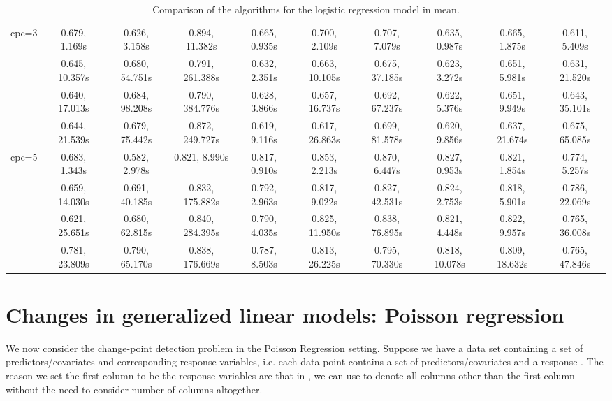 \documentclass[article]{jss}
\begin{document}
\begin{landscape}
\begin{table}[t!]
\begin{tabular}{@{}cccccccccc@{}}
    \multirow{4}{*}{cpc=3} & 0.679, 1.169s & 0.626, 3.158s & 0.894, 11.382s & 0.665, 0.935s & 0.700, 2.109s & 0.707, 7.079s & 0.635, 0.987s & 0.665, 1.875s & 0.611, 5.409s \\
                           & 0.645, 10.357s & 0.680, 54.751s & 0.791, 261.388s & 0.632, 2.351s & 0.663, 10.105s & 0.675, 37.185s & 0.623, 3.272s & 0.651, 5.981s & 0.631, 21.520s \\
                           & 0.640, 17.013s & 0.684, 98.208s & 0.790, 384.776s & 0.628, 3.866s & 0.657, 16.737s & 0.692, 67.237s & 0.622, 5.376s & 0.651, 9.949s & 0.643, 35.101s \\
                           & 0.644, 21.539s & 0.679, 75.442s & 0.872, 249.727s & 0.619, 9.116s & 0.617, 26.863s & 0.699, 81.578s & 0.620, 9.856s & 0.637, 21.674s & 0.675, 65.085s \\ \midrule
    \multirow{4}{*}{cpc=5} & 0.683, 1.343s & 0.582, 2.978s & 0.821, 8.990s & 0.817, 0.910s & 0.853, 2.213s & 0.870, 6.447s & 0.827, 0.953s & 0.821, 1.854s & 0.774, 5.257s \\
                           & 0.659, 14.030s & 0.691, 40.185s & 0.832, 175.882s & 0.792, 2.963s & 0.817, 9.022s & 0.827, 42.531s & 0.824, 2.753s & 0.818, 5.901s & 0.786, 22.069s \\
                           & 0.621, 25.651s & 0.680, 62.815s & 0.840, 284.395s & 0.790, 4.035s & 0.825, 11.950s & 0.838, 76.895s & 0.821, 4.448s & 0.822, 9.957s & 0.765, 36.008s \\
                           & 0.781, 23.809s & 0.790, 65.170s & 0.838, 176.669s & 0.787, 8.503s & 0.813, 26.225s & 0.795, 70.330s & 0.818, 10.078s & 0.809, 18.632s & 0.765, 47.846s \\ \bottomrule
    \end{tabular}
    \caption{\label{tab:logistic regression comparison} Comparison of the algorithms for the logistic regression model in mean.}
  \end{table}

\end{landscape}
\restoregeometry

\section{Changes in generalized linear models: Poisson regression} \label{sec:poisson}

We now consider the change-point detection problem in the Poisson Regression
setting. Suppose we have a data set containing a set of
predictors/covariates and corresponding response variables, i.e. each data point
 contains a set of predictors/covariates  and
a response . The reason we set the first column to be the
response variables are that in , we can use  to denote all
columns other than the first column without the need to consider number of
columns altogether.
\end{document}
